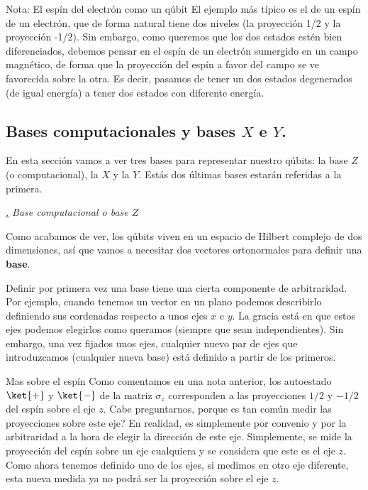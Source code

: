 \documentclass[a4paper,11pt]{book} %
\numberwithin{equation}{chapter}
\def\subsubiContadorIt{\par\addtocounter{subsubsection}{1}\underline{\it\thesubsubsection.}\hskip0.5cm \setcounter{subsubsubsectionIt}{0}}
\newcommand{\SubsubiIt}[1]{
		\subsubiContadorIt \textit{#1}
	}
\newcounter{subsubsubsectionIt}[subsubsection]
\begin{document}
\begin{mybox_blue}{Nota: El espín del electrón como un qúbit}
El ejemplo más típico es el de un espín de un electrón, que de forma natural tiene dos niveles (la proyección 1/2 y la proyección -1/2). Sin embargo, como queremos que los dos estados estén bien diferenciados, debemos pensar en el espín de un electrón sumergido en un campo magnético, de forma que la proyección del espín a favor del campo se ve favorecida sobre la otra. Es decir, pasamos de tener un dos estados degenerados (de igual energía) a tener dos estados con diferente energía. 
\end{mybox_blue}


	

	  	\subsection{Bases computacionales y bases $X$ e $Y$.}
	  	
En esta sección vamos a ver tres bases para representar nuestro qúbits: la base $Z$ (o computacional), la $X$ y la $Y$. Estás dos últimas bases estarán referidas a la primera.  
	  	
			\SubsubiIt{Base computacional o base $Z$} 
    	
Como acabamos de ver, los qúbits viven en un espacio de Hilbert complejo de dos dimensiones, así que vamos a necesitar dos vectores ortonormales para definir una \textbf{base}. 
    	
Definir por primera vez una base tiene una cierta componente de arbitraridad. Por ejemplo, cuando tenemos un vector en un plano podemos describirlo definiendo sus cordenadas respecto a unos ejes $x$ e $y$. La gracia está en que estos ejes podemos elegirlos como queramos (siempre que sean independientes). Sin embargo, una vez fijados unos ejes, cualquier nuevo par de ejes que introduzcamos (cualquier nueva base) está definido a partir de los primeros.


	\begin{mybox_blue}{Mas sobre el espín}
	Como comentamos en una nota anterior, los autoestado  $\ket{+}$ y $\ket{-}$ de la matriz $\sigma_z$ 
	corresponden a las proyecciones $1/2$ y $-1/2$ del espín sobre el eje $z$. Cabe preguntarnos, porque 
	es tan común medir las proyecciones sobre este eje? En realidad, es simplemente por convenio y 
	por la arbitraridad a la hora de elegir la dirección de este eje. Simplemente, se mide la 
	proyección del espín sobre un eje cualquiera y se considera que este es el eje $z$. Como ahora 
	tenemos definido uno de los ejes, si medimos en otro eje diferente, esta nueva medida  ya no podrá 
	ser la proyección sobre el eje $z$. 
	\end{mybox_blue}
\end{document}
